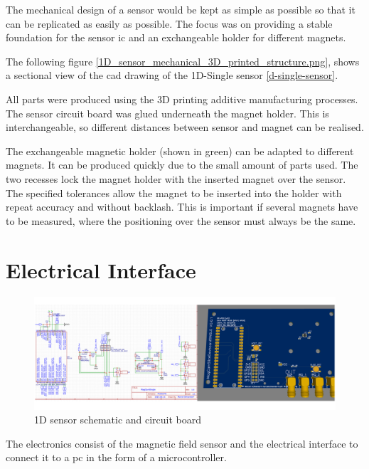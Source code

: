 The mechanical design of a sensor would be kept as simple as possible so
that it can be replicated as easily as possible. The focus was on
providing a stable foundation for the sensor \gls{ic} and an
exchangeable holder for different magnets.

The following figure
\ref{1D_sensor_mechanical_3D_printed_structure.png}, shows a sectional
view of the \gls{cad} drawing of the 1D-Single sensor
\ref{d-single-sensor}.

All parts were produced using the 3D printing additive manufacturing
processes. The sensor circuit board was glued underneath the magnet
holder. This is interchangeable, so different distances between sensor
and magnet can be realised.

The exchangeable magnetic holder (shown in green) can be adapted to
different magnets. It can be produced quickly due to the small amount of
parts used. The two recesses lock the magnet holder with the inserted
magnet over the sensor. The specified tolerances allow the magnet to be
inserted into the holder with repeat accuracy and without backlash. This
is important if several magnets have to be measured, where the
positioning over the sensor must always be the same.

\hypertarget{electrical-interface}{%
\section{Electrical Interface}\label{electrical-interface}}

\begin{figure}
\centering
\includegraphics{./generated_images/border_1D_sensor_schematic_and_circuit_board.png}
\caption{1D sensor schematic and circuit board
\label{1D_sensor_schematic_and_circuit_board.png}}
\end{figure}

The electronics consist of the magnetic field sensor and the electrical
interface to connect it to a \gls{pc} in the form of a microcontroller.

